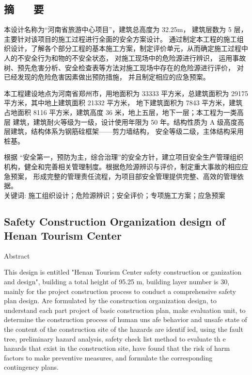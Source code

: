 \begin{center}
\section*{  \textbf{摘 ~~ 要}}
\end{center}

\vskip0.5cm
本设计名称为“河南省旅游中心项目”，建筑总高度为 32.25m， 建筑层数为 5  层，主要针对该项目的施工过程进行全面的安全方案设计。
通过制定本工程的施工组织设计，了解各个部分工程的基本施工方案，制定评价单元，从而确定施工过程中人的不安全行为和物的不安全状态，
对施工现场中的危险源进行辨识， 运用事故树、预先危害分析、安全检查表等方法对施工现场中存在的危险源进行评价， 对已经发现的危险危害因素做出预防措施，
并且制定相应的应急预案。

本工程建设地点为河南省郑州市，用地面积为 33333 平方米，总建筑面积为 29175 平方米，其中地上建筑面积 21332 平方米，
地下建筑面积为 7843 平方米，建筑占地面积 8116 平方米，建筑高度 36 米，地上五层，地下一层；本工程为一类高层
建筑，建筑耐火等级为一级，设计使用年限为 50 年。结构性质为 A 级高度高层建筑，结构体系为钢筋硂框架——剪力墙结构，
安全等级二级，主体结构采用桩基。

根据 “安全第一，预防为主，综合治理”的安全方针，建立项目安全生产管理组织机构，健全和完善相关管理制度。根据危险源辨识与评价，制定重大事故的相应应急预案，
形成完整的管理责任流程，为项目部安全管理提供完整、高效的管理依据。\\



{ \heiti 关键词: 施工组织设计；危险源辨识；安全评价；专项施工方案；应急预案}
\pagestyle{fancy}

\clearpage
\begin{center}
    \section*{  \textbf{Safety Construction Organization design of Henan Tourism Center}}
     Abstract
    \end{center}


   This design is entitled "Henan Tourism Center safety construction or ganization and design", building a total height of 95.25 m, building layer number is 30, 
   mainly for the project construction process to conduct a comprehensive safety plan design. Are formulated by the construction organization design, 
   to understand each part project of basic construction plan, make evaluation unit, to determine the construction process of human uns afe behavior 
   and unsafe state of the content of the construction site of the hazards are identif ied, using the fault tree, preliminary hazard analysis, safety 
   check list method to evaluate th e hazards that exist in the construction site, have found that the risk of harm factors to make preventive measures,
    and formulate the corresponding contingency plans.

